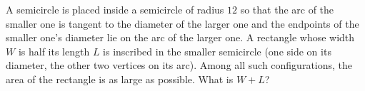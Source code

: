 A semicircle is placed inside a semicircle of radius $12$ so that the arc of the smaller one is tangent to the diameter of the larger one and the endpoints of the smaller one's diameter lie on the arc of the larger one. A rectangle whose width $W$ is half its length $L$ is inscribed in the smaller semicircle (one side on its diameter, the other two vertices on its arc). Among all such configurations, the area of the rectangle is as large as possible. What is $W+L$?
